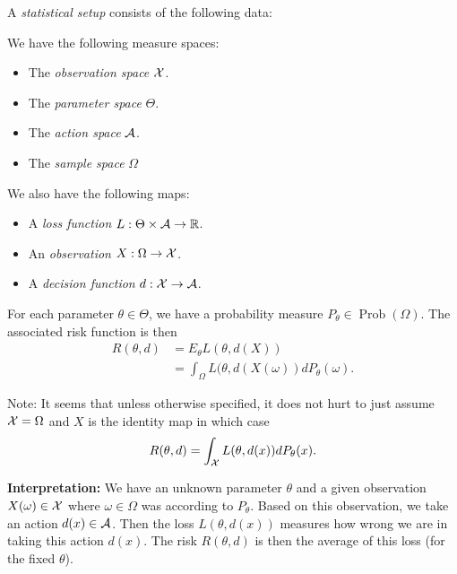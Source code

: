 \documentclass[twoside, a4paper, 10pt]{amsart}
\begin{document}
\begin{mydef} A \textit{statistical setup} consists of the following data:

We have the following measure spaces:

\begin{itemize}
	\item The \textit{observation space} $\mathcal{X}$.
	\item The \textit{parameter space} $\Theta$.
	\item The \textit{action space} $\mathcal{A}$.
	\item The \textit{sample space} $\Omega$
\end{itemize}

We also have the following maps:

\begin{itemize}
	\item A \textit{loss function} $L:\Theta \times \mathcal{A} \to \mathbb{R}$.
	\item An \textit{observation} $X: \Omega \to \mathcal{X}$.
	\item A \textit{decision function} $d:\mathcal{X} \to \mathcal{A}$.

\end{itemize}

For each parameter $\theta \in \Theta$, we have a probability measure $P_{\theta} \in \operatorname{Prob}(\Omega)$. The associated risk function is then \begin{align*} R(\theta, d) &= E_{\theta} L(\theta, d(X)) \\ &= \int_{\Omega} L(\theta, d(X(\omega)) dP_{\theta}(\omega).\end{align*}

\end{mydef}

Note: It seems that unless otherwise specified, it does not hurt to just assume $\mathcal{X} = \Omega$ and $X$ is the identity map in which case $$R(\theta, d) = \int_{\mathcal{X}} L(\theta, d(x)) dP_{\theta}(x).$$

\textbf{Interpretation:} We have an unknown parameter $\theta$ and a given observation $X(\omega) \in \mathcal{X}$ where $\omega \in \Omega$ was according to $P_{\theta}$. Based on this observation, we take an action $d(x) \in \mathcal{A}$. Then the loss $L(\theta, d(x))$ measures how wrong we are in taking this action $d(x)$. The risk $R(\theta, d)$ is then the average of this loss (for the fixed $\theta$).
\end{document}
